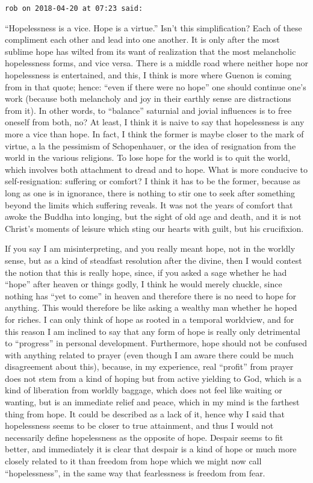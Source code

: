 \begin{footnotesize}
\begin{sffamily}
\texttt{rob on 2018-04-20 at 07:23 said:}

``Hopelessness is a vice. Hope is a virtue.'' Isn't this simplification? Each of these compliment each other and lead into one another. It is only after the most sublime hope has wilted from its want of realization that the most melancholic hopelessness forms, and vice versa. There is a middle road where neither hope nor hopelessness is entertained, and this, I think is more where Guenon is coming from in that quote; hence: ``even if there were no hope'' one should continue one's work (because both melancholy and joy in their earthly sense are distractions from it). In other words, to ``balance'' saturnial and jovial influences is to free oneself from both, no? At least, I think it is naive to say that hopelessness is any more a vice than hope. In fact, I think the former is maybe closer to the mark of virtue, a la the pessimism of Schopenhauer, or the idea of resignation from the world in the various religions. To lose hope for the world is to quit the world, which involves both attachment to dread and to hope. What is more conducive to self-resignation: suffering or comfort? I think it has to be the former, because as long as one is in ignorance, there is nothing to stir one to seek after something beyond the limits which suffering reveals. It was not the years of comfort that awoke the Buddha into longing, but the sight of old age and death, and it is not Christ's moments of leisure which sting our hearts with guilt, but his crucifixion.

If you say I am misinterpreting, and you really meant hope, not in the worldly sense, but as a kind of steadfast resolution after the divine, then I would contest the notion that this is really hope, since, if you asked a sage whether he had ``hope'' after heaven or things godly, I think he would merely chuckle, since nothing has ``yet to come'' in heaven and therefore there is no need to hope for anything. This would therefore be like asking a wealthy man whether he hoped for riches. I can only think of hope as rooted in a temporal worldview, and for this reason I am inclined to say that any form of hope is really only detrimental to ``progress'' in personal development. Furthermore, hope should not be confused with anything related to prayer (even though I am aware there could be much disagreement about this), because, in my experience, real ``profit'' from prayer does not stem from a kind of hoping but from active yielding to God, which is a kind of liberation from worldly baggage, which does not feel like waiting or wanting, but is an immediate relief and peace, which in my mind is the farthest thing from hope. It could be described as a lack of it, hence why I said that hopelessness seems to be closer to true attainment, and thus I would not necessarily define hopelessness as the opposite of hope. Despair seems to fit better, and immediately it is clear that despair is a kind of hope or much more closely related to it than freedom from hope which we might now call ``hopelessness'', in the same way that fearlessness is freedom from fear.


\end{sffamily}
\end{footnotesize}
